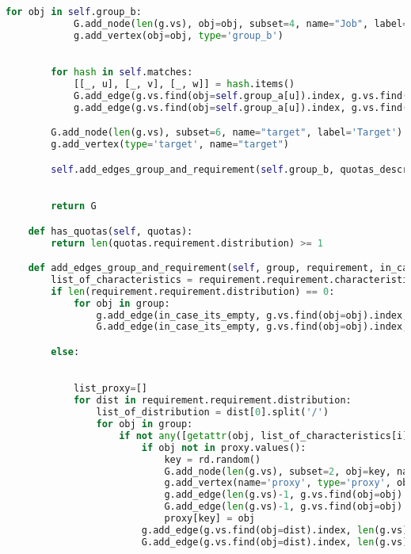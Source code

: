 \begin{apendicesenv}
\begin{lstlisting}[language=Python, caption={Fair Bipartite Matching Solver Source Code}]
        for obj in self.group_b:
            G.add_node(len(g.vs), obj=obj, subset=4, name="Job", label='Job')
            g.add_vertex(obj=obj, type='group_b')

        
        for hash in self.matches:
            [[_, u], [_, v], [_, w]] = hash.items()
            G.add_edge(g.vs.find(obj=self.group_a[u]).index, g.vs.find(obj=self.group_b[v]).index, capacity=1, weight=w)
            g.add_edge(g.vs.find(obj=self.group_a[u]).index, g.vs.find(obj=self.group_b[v]).index, capacity=1, weight=w)

        G.add_node(len(g.vs), subset=6, name="target", label='Target')
        g.add_vertex(type='target', name="target")

        self.add_edges_group_and_requirement(self.group_b, quotas_description([]), len(g.vs)-1, g, G)
        

        return G

    def has_quotas(self, quotas):
        return len(quotas.requirement.distribution) >= 1

    def add_edges_group_and_requirement(self, group, requirement, in_case_its_empty, g, G):
        list_of_characteristics = requirement.requirement.characteristic.split('/')
        if len(requirement.requirement.distribution) == 0:
            for obj in group:
                g.add_edge(in_case_its_empty, g.vs.find(obj=obj).index, capacity=1, weight=0)
                G.add_edge(in_case_its_empty, g.vs.find(obj=obj).index, capacity=1, weight=0)

        else:

            
            list_proxy=[]
            for dist in requirement.requirement.distribution:
                list_of_distribution = dist[0].split('/')    
                for obj in group:
                    if not any([getattr(obj, list_of_characteristics[i], None) != list_of_distribution[i] for i in range(len(list_of_distribution))]):
                        if obj not in proxy.values():
                            key = rd.random()
                            G.add_node(len(g.vs), subset=2, obj=key, name="proxy", label='proxy')
                            g.add_vertex(name='proxy', type='proxy', obj=key)
                            g.add_edge(len(g.vs)-1, g.vs.find(obj=obj).index, capacity=1, weight=0, type='proxy')
                            G.add_edge(len(g.vs)-1, g.vs.find(obj=obj).index, capacity=1, weight=0, type='proxy')
                            proxy[key] = obj
                        g.add_edge(g.vs.find(obj=dist).index, len(g.vs)-1, capacity=1, weight=0)
                        G.add_edge(g.vs.find(obj=dist).index, len(g.vs)-1, capacity=1, weight=0)


\end{lstlisting}
\end{apendicesenv}
